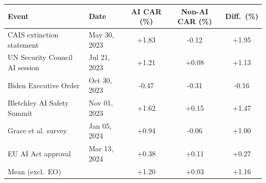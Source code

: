\begin{tabular}{@{}llccc@{}}
\toprule
Event & Date & AI CAR (\%) & Non-AI CAR (\%) & Diff.~(\%) \\
\midrule
CAIS extinction statement & May 30, 2023 & +1.83 & -0.12 & +1.95 \\
UN Security Council AI session & Jul 21, 2023 & +1.21 & +0.08 & +1.13 \\
Biden Executive Order & Oct 30, 2023 & -0.47 & -0.31 & -0.16 \\
Bletchley AI Safety Summit & Nov 01, 2023 & +1.62 & +0.15 & +1.47 \\
Grace et al. survey & Jan 05, 2024 & +0.94 & -0.06 & +1.00 \\
EU AI Act approval & Mar 13, 2024 & +0.38 & +0.11 & +0.27 \\
\midrule
Mean (excl.~EO) & & +1.20 & +0.03 & +1.16 \\
\bottomrule
\end{tabular}
